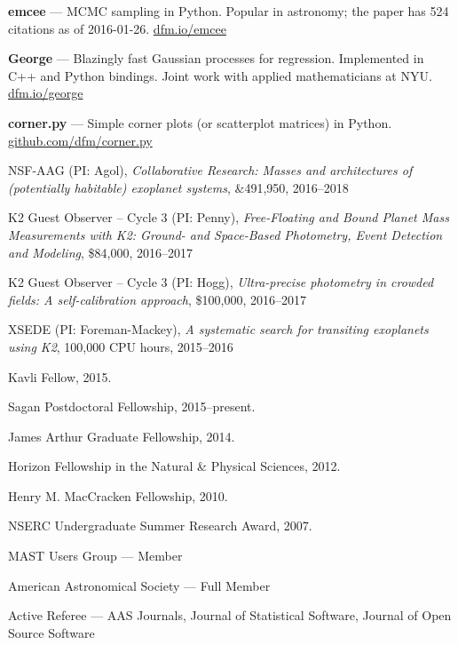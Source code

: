\documentclass[12pt,letterpaper]{article}
\begin{document}
\begin{list}{}{\cvlist}

\item {\bf emcee} ---
    MCMC sampling in Python. Popular in astronomy;
    the paper has 524 citations as of 2016-01-26.
    \url{dfm.io/emcee}

\item {\bf George} ---
    Blazingly fast Gaussian processes for regression. Implemented in C++ and
    Python bindings. Joint work with applied mathematicians at NYU.
    \url{dfm.io/george}

\item {\bf corner.py} ---
    Simple corner plots (or scatterplot matrices) in Python.
    \url{github.com/dfm/corner.py}

\end{list}

\begin{list}{}{\cvlist}
\item
NSF-AAG (PI: Agol),
\emph{Collaborative Research: Masses and architectures of (potentially
    habitable) exoplanet systems},
\&491,950, 2016--2018
\item
K2 Guest Observer -- Cycle 3 (PI: Penny),
\emph{Free-Floating and Bound Planet Mass Measurements with K2: Ground- and
Space-Based Photometry, Event Detection and Modeling},
\$84,000, 2016--2017
\item
K2 Guest Observer -- Cycle 3 (PI: Hogg),
\emph{Ultra-precise photometry in crowded fields: A self-calibration
approach},
\$100,000, 2016--2017
\item
XSEDE (PI: Foreman-Mackey),
\emph{A systematic search for transiting exoplanets using K2},
100,000 CPU hours, 2015--2016
\end{list}


\begin{list}{}{\cvlist}

\item Kavli Fellow, 2015.
\item Sagan Postdoctoral Fellowship, 2015--present.
\item James Arthur Graduate Fellowship, 2014.
\item Horizon Fellowship in the Natural \& Physical Sciences, 2012.
\item Henry M. MacCracken Fellowship, 2010.
\item NSERC Undergraduate Summer Research Award, 2007.

\end{list}


\begin{list}{}{\cvlist}
\item MAST Users Group --- Member
\item American Astronomical Society --- Full Member
\item Active Referee ---
    AAS Journals,
    Journal of Statistical Software,
    Journal of Open Source Software
\end{list}
\end{document}
